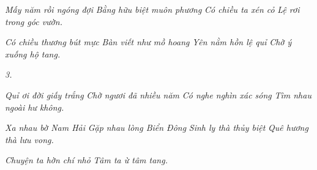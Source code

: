 \documentclass[../main.tex]{subfiles}
\begin{document}
\begin{multicols}{2}
\textit{Mấy năm rồi ngóng đợi} 
\textit{Bằng hữu biệt muôn phương} 
\textit{Có chiều ta xén cỏ} 
\textit{Lệ rơi trong góc vườn.} 
 
\textit{Có chiều thương bút mực} 
\textit{Bàn viết như mồ hoang} 
\textit{Yên nằm hồn lệ quỉ} 
\textit{Chờ ý xuống hộ tang.} 
 
\textit{3.} 
 
\textit{Quỉ ơi đời giấy trắng} 
\textit{Chờ ngươi đã nhiều năm} 
\textit{Có nghe nghìn xác sóng} 
\textit{Tìm nhau ngoài hư không.} 
 
\textit{Xa nhau bờ Nam Hải} 
\textit{Gặp nhau lòng Biển Đông  } 
\textit{Sinh ly thà thủy biệt} 
\textit{Quê hương thà lưu vong.} 
 
\textit{Chuyện ta hờn chí nhỏ} 
\textit{Tâm ta ừ tâm tang.} 
 
 


\end{multicols}
\end{document}
